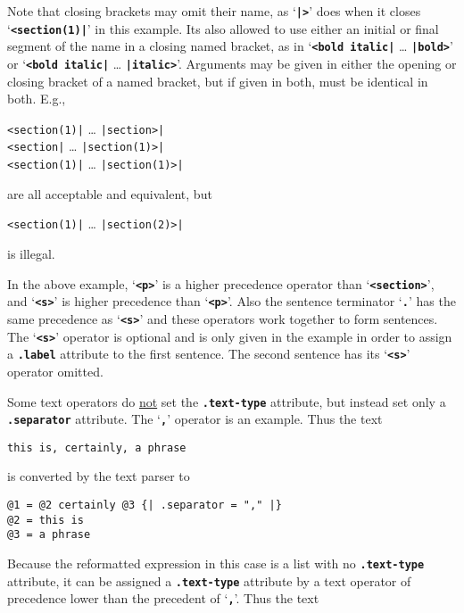 \documentclass[12pt]{article}
\newcommand{\TT}[1]{{\tt \bfseries #1}}
\newenvironment{indpar}[1][0.3in]%
	{\begin{list}{}%
		     {\setlength{\itemsep}{0in}%
		      \setlength{\topsep}{0in}%
		      \setlength{\parsep}{1ex}%
		      \setlength{\labelwidth}{#1}%
		      \setlength{\leftmargin}{#1}%
		      \addtolength{\leftmargin}{\labelsep}}%
	 \item}%
	{\end{list}}
\begin{document}
Note that closing brackets may omit their name, as `\TT{|>}' does
when it closes `\TT{<section(1)|}' in this example.  Its also allowed to
use either an initial or final segment of the name in a closing
named bracket, as in `\TT{<bold italic|} \ldots{} \TT{|bold>}'
or `\TT{<bold italic|} \ldots{} \TT{|italic>}'.
Arguments may be given in either the opening or closing bracket of a named
bracket, but if given in both, must be identical in both.  E.g.,
\begin{center}
\verb/<section(1)|/ \ldots{} \verb/|section>|/ \\
\verb/<section|/ \ldots{} \verb/|section(1)>|/ \\
\verb/<section(1)|/ \ldots{} \verb/|section(1)>|/ \\
\end{center}
are all acceptable and equivalent, but
\begin{center}
\verb/<section(1)|/ \ldots{} \verb/|section(2)>|/
\end{center}
is illegal.


In the above example,
`\TT{<p>}' is a higher precedence operator than `\TT{<section>}', and
`\TT{<s>}' is higher precedence than `\TT{<p>}'.  Also the sentence
terminator `\TT{.}' has the same precedence as `\TT{<s>}' and these
operators work together to form sentences.  The `\TT{<s>}' operator
is optional and is only given in the example in order to assign a \TT{.label}
attribute to the first sentence.  The second sentence has its `\TT{<s>}'
operator omitted.

Some text operators do \underline{not} set the \TT{.text-type} attribute,
but instead set only a \TT{.separator} attribute.  The `\TT{,}'
operator is an example.  Thus the text

\begin{indpar}\begin{verbatim}
this is, certainly, a phrase
\end{verbatim}\end{indpar}

is converted by the text parser to

\begin{indpar}\begin{verbatim}
@1 = @2 certainly @3 {| .separator = "," |}
@2 = this is
@3 = a phrase
\end{verbatim}\end{indpar}

Because the reformatted expression in this case is a list with
no \TT{.text-type} attribute, it can be assigned a \TT{.text-type}
attribute by a text operator of precedence lower than the
precedent of `\TT{,}'.  Thus the text
\end{document}
